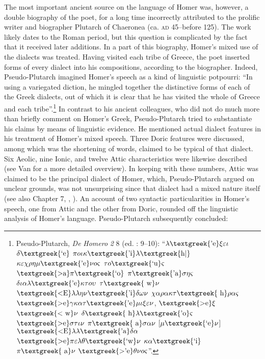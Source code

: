 \documentclass[output=paper]{langsci/langscibook}
\begin{document}
The most important ancient source on the language of Homer was, however, a double biography of the poet, for a long time incorrectly attributed to the prolific writer and biographer Plutarch of Chaeronea (ca. \textsc{ad} 45–before 125). The work likely dates to the Roman period, but this question is complicated by the fact that it received later additions. In a part of this biography, Homer’s mixed use of the dialects was treated. Having visited each tribe of Greece, the poet inserted forms of every dialect into his compositions, according to the biographer. Indeed, Pseudo-Plutarch imagined Homer’s speech as a kind of linguistic potpourri: “In using a variegated diction, he mingled together the distinctive forms of each of the Greek dialects, out of which it is clear that he has visited the whole of Greece and each tribe”.\footnote{Pseudo-Plutarch, \textit{De} \textit{Homero} \textit{2} 8 (ed. \citealt{Kindstrand1990}: 9–10): “$\lambda \text{\textgreek{'e}}\xi \varepsilon \iota $ $\delta \text{\textgreek{`e}}$ $\pi o\iota \kappa \text{\textgreek{'i}}\lambda \text{\textgreek{h|}}$ $\kappa \varepsilon \chi \rho \eta \mu \text{\textgreek{'e}}\nu o\varsigma $ $\tau o\text{\textgreek{`u}}\varsigma $ $\text{\textgreek{>a}}\pi \text{\textgreek{`o}}$ $\pi \text{\textgreek{'a}}\sigma \eta \varsigma $ $\delta \iota \alpha \lambda \text{\textgreek{'e}}\kappa \tau o\upsilon $ $\tau \text{\textgreek{~w}}\nu $ $\text{\textgreek{<E}}\lambda \lambda \eta \nu \text{\textgreek{'i}}\delta \omega \nu $ $\chi \alpha \rho \alpha \kappa \tau \text{\textgreek{~h}}\rho \alpha \varsigma $ $\text{\textgreek{>e}}\gamma \kappa \alpha \tau \text{\textgreek{'e}}\mu \iota \xi \varepsilon \nu $, $\text{\textgreek{>e}}\xi $ $\text{\textgreek{<~w}}\nu $ $\delta \text{\textgreek{~h}}\lambda \text{\textgreek{'o}}\varsigma $ $\text{\textgreek{>e}}\sigma \tau \iota \nu $ $\pi \text{\textgreek{~a}}\sigma \alpha \nu $ [$\mu \text{\textgreek{`e}}\nu $] $\text{\textgreek{<E}}\lambda \lambda \text{\textgreek{'a}}\delta \alpha $ $\text{\textgreek{>e}}\pi \varepsilon \lambda \theta \text{\textgreek{`w}}\nu $ $\kappa \alpha \text{\textgreek{`i}}$ $\pi \text{\textgreek{~a}}\nu $ $\text{\textgreek{>'e}}\theta \nu o\varsigma $”.} In contrast to his ancient colleagues, who did not do much more than briefly comment on Homer’s Greek, Pseudo-Plutarch tried to substantiate his claims by means of linguistic evidence. He mentioned actual dialect features in his treatment of Homer’s mixed speech. Three Doric features were discussed, among which was the shortening of words, claimed to be typical of that dialect. Six Aeolic, nine Ionic, and twelve Attic characteristics were likewise described (see Van \citealt{Rooy2018c} for a more detailed overview). In keeping with these numbers, Attic was claimed to be the principal dialect of Homer, which, Pseudo-Plutarch argued on unclear grounds, was not unsurprising since that dialect had a mixed nature itself (see also Chapter 7, , ). An account of two syntactic particularities in Homer’s speech, one from Attic and the other from Doric, rounded off the linguistic analysis of Homer’s language. Pseudo-Plutarch subsequently concluded:
\end{document}
